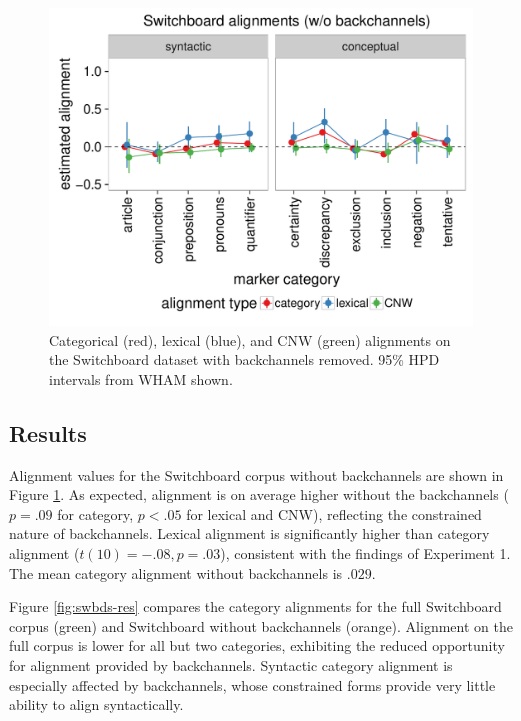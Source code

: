 \documentclass[11pt]{article}
\begin{document}
\begin{figure}[t]
  \begin{center}
    \includegraphics[width=\columnwidth]{results/swbdn_line.pdf}\vspace{-10pt}
  \end{center}
  \caption{Categorical (red), lexical (blue), and CNW (green) alignments on the Switchboard dataset with backchannels removed. 95\% HPD intervals from WHAM shown.}\label{fig:swbdn-res}
\end{figure}


\subsection{Results}

Alignment values for the Switchboard corpus without backchannels are shown in Figure \ref{fig:swbdn-res}. As expected, alignment is on average higher without the backchannels ($p=.09$ for category, $p<.05$ for lexical and CNW), reflecting the constrained nature of backchannels. Lexical alignment is significantly higher than category alignment ($t(10) =-.08, p = .03$), consistent with the findings of Experiment 1. The mean category alignment without backchannels is $.029$.

Figure \ref{fig:swbds-res} compares the category alignments for the full Switchboard corpus (green) and Switchboard without backchannels (orange). Alignment on the full corpus is lower for all but two categories, exhibiting the reduced opportunity for alignment provided by backchannels. Syntactic category alignment is especially affected by backchannels, whose constrained forms provide very little ability to align syntactically.
\end{document}
